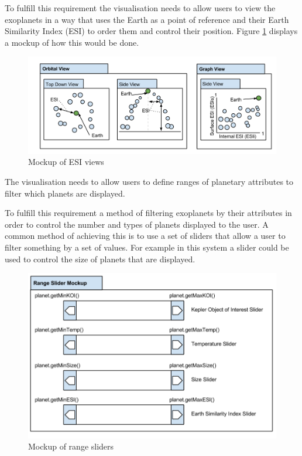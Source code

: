 \begin{enumerate}
To fulfill this requirement the visualisation needs to allow users to view the
exoplanets in a way that uses the Earth as a point of reference and their Earth
Similarity Index (ESI) to order them and control their position. Figure \ref{fig:esiMock} displays a mockup of how this would be done.

\begin{figure}[H]
  \centering
      \includegraphics[width=1\textwidth]{images/mockupESI.png}
  \caption{Mockup of ESI views}
  \label{fig:esiMock}
\end{figure}

\clearpage
{\bf
 \item[R4.] The visualisation needs to allow users to define ranges of planetary
attributes to filter which planets are displayed.}

To fulfill this requirement a method of filtering exoplanets by their attributes
in order to control the number and types of planets displayed to the user. A
common method of achieving this is to use a set of sliders that allow a user to
filter something by a set of values. For example in this system a slider could
be used to control the size of planets that are displayed.

\begin{figure}[H]
  \centering
      \includegraphics[width=.8\textwidth]{images/mockSlider.png}
  \caption{Mockup of range sliders}  
\end{figure}


\end{enumerate}
